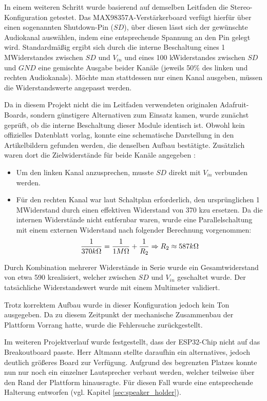In einem weiteren Schritt wurde basierend auf demselben Leitfaden die Stereo-Konfiguration getestet. 
Das MAX98357A-Verstärkerboard verfügt hierfür über einen sogenannten Shutdown-Pin ($SD$), über diesen lässt sich der gewünschte Audiokanal auswählen, indem eine entsprechende Spannung an den Pin gelegt wird.
Standardmäßig ergibt sich durch die interne Beschaltung eines 1 M\textOmega \space Widerstandes zwischen $SD$ und $V_{in}$ und eines 100 k\textOmega \space Widerstandes zwischen $SD$ und $GND$ eine gemischte Ausgabe beider Kanäle (jeweils 50\% des linken und rechten Audiokanals). 
Möchte man stattdessen nur einen Kanal ausgeben, müssen die Widerstandswerte angepasst werden.

Da in diesem Projekt nicht die im Leitfaden verwendeten originalen Adafruit-Boards, sondern günstigere Alternativen zum Einsatz kamen, wurde zunächst geprüft, ob die interne Beschaltung dieser Module identisch ist. 
Obwohl kein offizielles Datenblatt vorlag, konnte eine schematische Darstellung in den Artikelbildern gefunden werden, die denselben Aufbau bestätigte. 
Zusätzlich waren dort die Zielwiderstände für beide Kanäle angegeben \cite{raspberry_max98357}:

\begin{itemize}
    \item Um den linken Kanal anzusprechen, musste $SD$ direkt mit $V_{in}$ verbunden werden.
    \item Für den rechten Kanal war laut Schaltplan erforderlich, den ursprünglichen 1 M\textOmega \space Widerstand durch einen effektiven Widerstand von 370 k\textOmega \space zu ersetzen. 
    Da die internen Widerstände nicht entfernbar waren, wurde eine Parallelschaltung mit einem externen Widerstand nach folgender Berechnung vorgenommen:
    \[
    \frac{1}{370 k\Omega} = \frac{1}{1 M\Omega} + \frac{1}{R_2} \space\Rightarrow\space
    R_2 \approx 587 k\Omega 
    \]
\end{itemize}

Durch Kombination mehrerer Widerstände in Serie wurde ein Gesamtwiderstand von etwa 590 k\textOmega \space realisiert, welcher zwischen $SD$ und $V_{in}$ geschaltet wurde. 
Der tatsächliche Widerstandswert wurde mit einem Multimeter validiert.

Trotz korrektem Aufbau wurde in dieser Konfiguration jedoch kein Ton ausgegeben. 
Da zu diesem Zeitpunkt der mechanische Zusammenbau der Plattform Vorrang hatte, wurde die Fehlersuche zurückgestellt.

Im weiteren Projektverlauf wurde festgestellt, dass der ESP32-Chip nicht auf das Breakoutboard passte. 
Herr Altmann stellte daraufhin ein alternatives, jedoch deutlich größeres Board zur Verfügung. 
Aufgrund des begrenzten Platzes konnte nun nur noch ein einzelner Lautsprecher verbaut werden, welcher teilweise über den Rand der Plattform hinausragte. 
Für diesen Fall wurde eine entsprechende Halterung entworfen (vgl. Kapitel \ref{sec:speaker_holder}).

